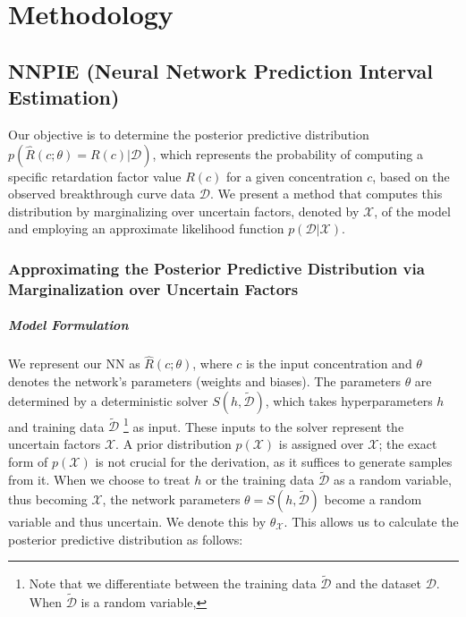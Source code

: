 \chapter{Methodology}
\label{sec:methodology}
\section{NNPIE (Neural Network Prediction Interval Estimation)}
Our objective is to determine the posterior predictive distribution $p(\hat{R}(c;\theta) = R(c)| \mathcal{D})$, which represents the probability of computing a specific retardation factor value $R(c)$ for a given concentration $c$, based on the observed breakthrough curve data $\mathcal{D}$. We present a method that computes this distribution by marginalizing over uncertain factors, denoted by $\mathcal{X}$, of the model and employing an approximate likelihood function $p(\mathcal{D} | \mathcal{X})$.

\subsection{Approximating the Posterior Predictive Distribution via Marginalization over Uncertain Factors}

\paragraph{Model Formulation}
We represent our NN as $\hat{R}(c;\theta)$, where $c$ is the input concentration and $\theta$ denotes the network's parameters (weights and biases). The parameters $\theta$ are determined by a deterministic solver $S(h, \tilde{\mathcal{D}})$, which takes hyperparameters $h$ and training data $\tilde{\mathcal{D}}$ \footnote{Note that we differentiate between the training data $\tilde{\mathcal{D}}$ and the dataset $\mathcal{D}$. When $\tilde{\mathcal{D}}$ is a random variable, } as input. These inputs to the solver represent the uncertain factors $\mathcal{X}$. A prior distribution $p(\mathcal{X})$ is assigned over $\mathcal{X}$; the exact form of $p(\mathcal{X})$ is not crucial for the derivation, as it suffices to generate samples from it.
When we choose to treat $h$ or the training data $\tilde{\mathcal{D}}$ as a random variable, thus becoming $\mathcal{X}$, the network parameters $\theta = S(h, \tilde{\mathcal{D}})$ become a random variable and thus uncertain. We denote this by $\theta_{\mathcal{X}}$.
This allows us to calculate the posterior predictive distribution as follows:

